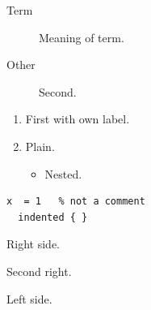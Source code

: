 \documentclass{article}
\begin{document}
\begin{description}
\item[Term] Meaning of term.
\item[Other] Second.
\end{description}
\begin{enumerate}
\item[(a)] First with own label.
\item Plain.
\begin{itemize}
\item Nested.
\end{itemize}
\end{enumerate}
\begin{verbatim}
x  = 1   % not a comment
  indented { }
\end{verbatim}
\begin{flushright}
Right side.

Second right.
\end{flushright}
\begin{flushleft}
Left side.
\end{flushleft}
\end{document}
